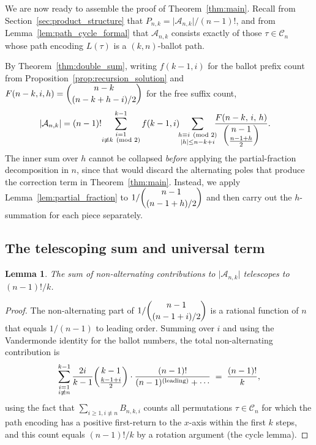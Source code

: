 \documentclass[12pt,a4paper]{article}
\newtheorem{lemma}[theorem]{Lemma}
\theoremstyle{definition}
\newcommand{\Cn}{\mathcal{C}_n}
\renewcommand{\binom}[2]{\dbinom{#1}{#2}}
\newcommand{\abs}[1]{\lvert #1 \rvert}
\begin{document}
We are now ready to assemble the proof of Theorem~\ref{thm:main}.
Recall from Section~\ref{sec:product_structure} that
$P_{n,k}=\abs{\mathcal{A}_{n,k}}/(n-1)!$,
and from Lemma~\ref{lem:path_cycle_formal} that $\mathcal{A}_{n,k}$
consists exactly of those $\tau\in\Cn$ whose path encoding $L(\tau)$
is a $(k,n)$-ballot path.

By Theorem~\ref{thm:double_sum}, writing $f(k-1,i)$ for the ballot
prefix count from Proposition~\ref{prop:recursion_solution} and
$F(n-k,i,h)=\binom{n-k}{(n-k+h-i)/2}$ for the free suffix count,
\begin{align}
\abs{\mathcal{A}_{n,k}}
&= (n-1)!\!
   \sum_{\substack{i=1\\i\not\equiv k\pmod{2}}}^{k-1}
   f(k-1,i)
   \!\!
   \sum_{\substack{h\equiv i\pmod{2}\\
                  \abs{h}\le n-k+i}}
   \!\!\!
   \frac{F(n-k,\,i,\,h)}{\dbinom{n-1}{\frac{n-1+h}{2}}}.
   \label{eq:Ank_double}
\end{align}
The inner sum over $h$ cannot be collapsed \emph{before} applying the
partial-fraction decomposition in $n$, since that would discard the
alternating poles that produce the correction term in
Theorem~\ref{thm:main}.  Instead, we apply
Lemma~\ref{lem:partial_fraction} to $1/\binom{n-1}{(n-1+h)/2}$ and
then carry out the $h$-summation for each piece separately.

\subsection{The telescoping sum and universal term}

\begin{lemma}
\label{lem:telescope}
The sum of non-alternating contributions to $\abs{\mathcal{A}_{n,k}}$
telescopes to $(n-1)!/k$.
\end{lemma}

\begin{proof}
The non-alternating part of $1/\binom{n-1}{(n-1+i)/2}$ is a rational
function of $n$ that equals $1/(n-1)$ to leading order.  Summing over
$i$ and using the Vandermonde identity for the ballot numbers, the total
non-alternating contribution is
\[
\sum_{\substack{i=1\\i\not\equiv n}}^{k-1}
\frac{2i}{k-1}\binom{k-1}{\frac{k-1+i}{2}}
\cdot
\frac{(n-1)!}{(n-1)^{\text{(leading)}}+\cdots}
\;=\;
\frac{(n-1)!}{k},
\]
using the fact that $\sum_{i\ge 1, i\not\equiv n} B_{n,k,i}$ counts
all permutations $\tau\in\Cn$ for which the path encoding has a
positive first-return to the $x$-axis within the first $k$ steps, and
this count equals $(n-1)!/k$ by a rotation argument (the cycle lemma).
\end{proof}
\end{document}
